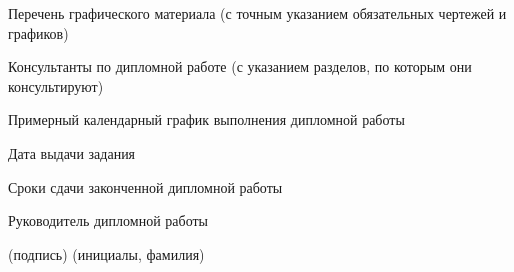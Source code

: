 \documentclass[14pt, a4paper]{extreport}
\begin{document}
\noindent\underline{}
\noindent\underline{}

\noindent\underline{}
 
\vspace{0.5cm}
 
\noindent Перечень графического материала (с точным указанием обязательных чертежей и графиков)
 
\noindent\underline{\hspace{\textwidth}}
 
\noindent\underline{\hspace{\textwidth}}
 
\vspace{0.5cm}
 
\noindent Консультанты по дипломной работе (с указанием разделов, по которым они консультируют)\underline{\hspace{3cm}}
 
\noindent\underline{\hspace{\textwidth}}
 
\vspace{0.5cm}
 
\noindent Примерный календарный график выполнения дипломной работы
 
\noindent\underline{\hspace{\textwidth}}
 
\noindent\underline{\hspace{\textwidth}}
 
\noindent\underline{\hspace{\textwidth}}
 
\vspace{0.3cm}
 
\noindent Дата выдачи задания\underline{\hspace{6cm}}
 
\noindent Сроки сдачи законченной дипломной работы\underline{\hspace{4cm}}
 
\vspace{0.5cm}
 
\noindent Руководитель дипломной работы \underline{\hspace{2cm}} \underline{\hspace{3cm}}\\
{\hspace{5.5cm}\footnotesize (подпись) \hspace{2cm} (инициалы, фамилия)\par}
 
\end{document}
